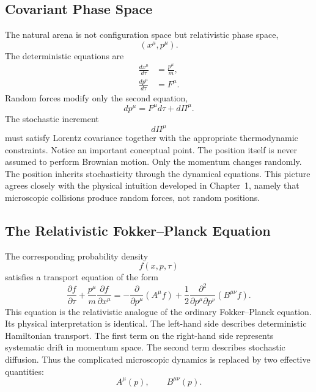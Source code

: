 \subsection{Covariant Phase Space}
The natural arena is not configuration space but relativistic phase
space,
\[(x^\mu,p^\mu).\]
The deterministic equations are
\begin{align}
\frac{dx^\mu}{d\tau}&=\frac{p^\mu}{m},\\
\frac{dp^\mu}{d\tau}&=F^\mu .
\end{align}
Random forces modify only the second equation,
\begin{equation}
dp^\mu=F^\mu d\tau+d\Pi^\mu .
\label{eq:DebNoise}
\end{equation}
The stochastic increment
\[d\Pi^\mu\]
must satisfy Lorentz covariance together with the appropriate
thermodynamic constraints.
Notice an important conceptual point.
The position itself is never assumed to perform Brownian motion.
Only the momentum changes randomly.
The position inherits stochasticity through the dynamical equations.
This picture agrees closely with the physical intuition developed in
Chapter~1, namely that microscopic collisions produce random forces,
not random positions.
\subsection{The Relativistic Fokker--Planck Equation}
The corresponding probability density
\[f(x,p,\tau)\]
satisfies a transport equation of the form
\begin{equation}
\boxed{\frac{\partial f}{\partial\tau}
+\frac{p^\mu}{m}\frac{\partial f}{\partial x^\mu}
=-\frac{\partial}{\partial p^\mu}(A^\mu f)
+\frac12\frac{\partial^2}{\partial p^\mu\partial p^\nu}(B^{\mu\nu}f).}
\label{eq:RelFPGeneral}
\end{equation}
This equation is the relativistic analogue of the ordinary
Fokker--Planck equation.
Its physical interpretation is identical.
The left-hand side describes deterministic Hamiltonian transport.
The first term on the right-hand side represents systematic drift in
momentum space.
The second term describes stochastic diffusion.
Thus the complicated microscopic dynamics is replaced by two effective
quantities:
\[A^\mu(p),\qquad B^{\mu\nu}(p). \]
